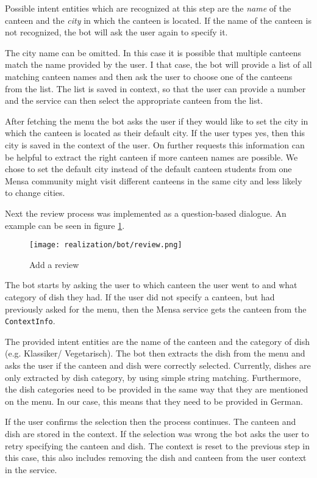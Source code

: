 Possible intent entities which are recognized at this step are the \emph{name} of the canteen and the \emph{city} in which the canteen is located.
If the name of the canteen is not recognized, the bot will ask  the user again to specify it. 

The city name can be omitted. In this case it is possible that multiple canteens match the name provided by the user. I that case, the bot will provide a list of all matching canteen names and then ask the user to choose one of the canteens from the list. The list is saved in context, so that the user can provide a number and the service can then select the appropriate canteen from the list.

After fetching the menu the bot asks the user if they would like to set the city in which the canteen is located as their default city. If the user types yes, then this city is saved in the context of the user. On further requests this information can be helpful to extract the right canteen if more canteen names are possible. 
We chose to set the default city instead of the default canteen students from one Mensa community might visit different canteens in the same city and less likely to change cities. 

Next the review process was implemented as a question-based dialogue. An example can be seen in figure \ref{fig:addReview}.

\begin{figure}[h]
    \centering
    \texttt{[image: realization/bot/review.png]}
    \caption{Add a review}
    \label{fig:addReview}
\end{figure}

The bot starts by asking the user to which canteen the user went to and what category of dish they had. If the user did not specify a canteen, but had previously asked for the menu, then the Mensa service gets the canteen from the \texttt{ContextInfo}. 

The provided intent entities are the name of the canteen and the category of dish (e.g. Klassiker/ Vegetarisch).
The bot then extracts the dish from the menu and asks the user if the canteen and dish were correctly selected. 
Currently, dishes are only extracted by dish category, by using simple string matching. Furthermore, the dish categories need to be provided in the same way that they are mentioned on the menu. In our case, this means that they need to be provided in German.

If the user confirms the selection then the process continues. 
The canteen and dish are stored in the context. 
If the selection was wrong the bot asks the user to retry specifying the canteen and dish. 
The context is reset to the previous step in this case, this also includes removing the dish and canteen from the user context in the service.

